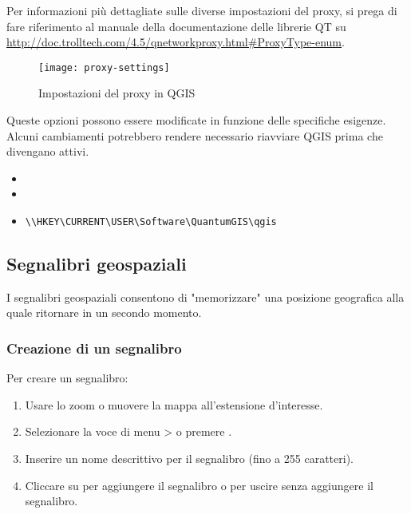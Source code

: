 Per informazioni più dettagliate sulle diverse impostazioni del proxy,
si prega di fare riferimento al manuale della documentazione delle librerie QT su
\url{http://doc.trolltech.com/4.5/qnetworkproxy.html#ProxyType-enum}.

\begin{figure}[ht]
   \begin{center}
   \caption{Impostazioni del proxy in QGIS \nixcaption}
   \texttt{[image: proxy-settings]}
   \label{fig:proxy-settings}
\end{center} 
\end{figure}

\begin{Tip} \caption{\textsc{Utilizzo dei proxy}}
\end{Tip}

Queste opzioni possono essere modificate in funzione delle specifiche
esigenze. Alcuni cambiamenti potrebbero rendere necessario riavviare QGIS
prima che divengano attivi.

\begin{itemize}
\item {}
\item {}
\item {}
\begin{verbatim}
\\HKEY\CURRENT\USER\Software\QuantumGIS\qgis
\end{verbatim}
\end{itemize}


\subsection{Segnalibri geospaziali}\label{sec:bookmarks}

I segnalibri geospaziali consentono di "memorizzare" una posizione
geografica alla quale ritornare in un secondo momento.

\subsubsection{Creazione di un segnalibro}
Per creare un segnalibro:
\begin{enumerate}
\item Usare lo zoom o muovere la mappa all'estensione d'interesse.
\item Selezionare la voce di menu  >
 o premere .
\item Inserire un nome descrittivo per il segnalibro (fino a 255 caratteri).
\item Cliccare su  per aggiungere il segnalibro o 
per uscire senza aggiungere il segnalibro.
\end{enumerate}

